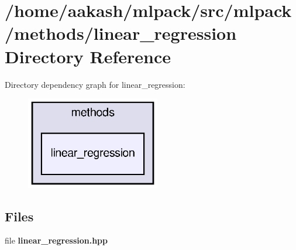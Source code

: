 \section{/home/aakash/mlpack/src/mlpack/methods/linear\+\_\+regression Directory Reference}
\label{dir_4d2e3386df08a2adcb8df83d3f41b016}
Directory dependency graph for linear\+\_\+regression\+:
\nopagebreak
\begin{figure}[H]
\begin{center}
\leavevmode
\includegraphics[width=166pt]{dir_4d2e3386df08a2adcb8df83d3f41b016_dep}
\end{center}
\end{figure}
\subsection*{Files}
\begin{DoxyCompactItemize}
\item 
file \textbf{ linear\+\_\+regression.\+hpp}
\end{DoxyCompactItemize}
